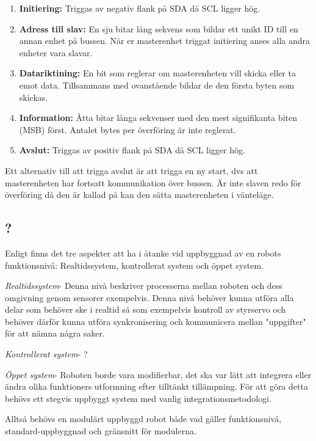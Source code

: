 \documentclass[11pt]{article}
\begin{document}
\begin{flushleft}
\begin{enumerate}
	\item \textbf{Initiering:} Triggas av negativ flank på SDA då SCL ligger hög.
	\item \textbf{Adress till slav:} En sju bitar lång sekvens som bildar ett unikt ID till en annan enhet på bussen. När er masterenhet triggat initiering anses alla andra enheter vara slavar.
	\item \textbf{Datariktining:} En bit som reglerar om masterenheten vill skicka eller ta emot data. Tillsammans med ovanstående bildar de den första byten som skickas.
	\item \textbf{Information:} Åtta bitar långa sekvenser med den mest signifikanta biten (MSB) först. Antalet bytes per överföring är inte reglerat.
	\item \textbf{Avslut:} Triggas av positiv flank på SDA då SCL ligger hög.
\end{enumerate}

Ett alternativ till att trigga avslut är att trigga en ny start, dvs att masterenheten har fortsatt kommunikation över bussen. Är inte slaven redo för överföring då den är kallad på kan den sätta masterenheten i vänteläge.

\subsection{?}
Enligt \cite{GenoM} finns det tre aspekter att ha i åtanke vid uppbyggnad av en robots funktionsnivå: Realtidssystem, kontrollerat system och öppet system. 

\textit{Realtidssystem}- Denna nivå beskriver processerna mellan roboten och dess omgivning genom sensorer exempelvis. Denna nivå behöver kunna utföra alla delar som behöver ske i realtid så som exempelvis kontroll av styrservo och behöver därför kunna utföra synkronisering och kommunicera mellan "uppgifter" för att nämna några saker. 

\textit{Kontrollerat system}- ?

\textit{Öppet system}- Roboten borde vara modifierbar, det ska var lätt att integrera eller ändra olika funktioners utformning efter tilltänkt tillämpning. För att göra detta behövs ett stegvis uppbyggt system med vanlig integrationsmetodologi. 

Alltså behövs en modulärt uppbyggd robot både vad gäller funktionsnivå, standard-uppbyggnad och gränsnitt för modulerna. 


\end{flushleft}
\end{document}
